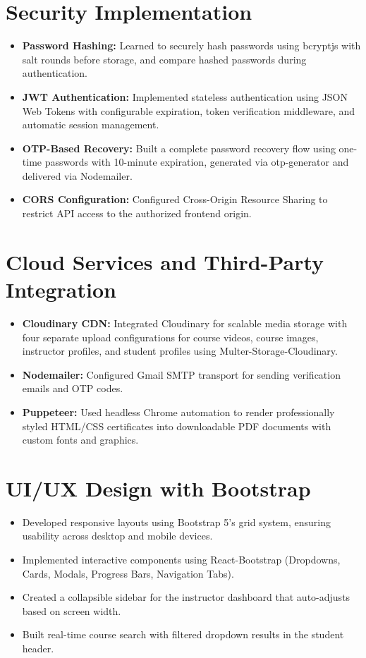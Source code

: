 \documentclass[12pt,a4paper]{report}
\begin{document}
\section{Security Implementation}
\begin{itemize}
    \item \textbf{Password Hashing:} Learned to securely hash passwords using bcryptjs with salt rounds before storage, and compare hashed passwords during authentication.
    \item \textbf{JWT Authentication:} Implemented stateless authentication using JSON Web Tokens with configurable expiration, token verification middleware, and automatic session management.
    \item \textbf{OTP-Based Recovery:} Built a complete password recovery flow using one-time passwords with 10-minute expiration, generated via otp-generator and delivered via Nodemailer.
    \item \textbf{CORS Configuration:} Configured Cross-Origin Resource Sharing to restrict API access to the authorized frontend origin.
\end{itemize}

\section{Cloud Services and Third-Party Integration}
\begin{itemize}
    \item \textbf{Cloudinary CDN:} Integrated Cloudinary for scalable media storage with four separate upload configurations for course videos, course images, instructor profiles, and student profiles using Multer-Storage-Cloudinary.
    \item \textbf{Nodemailer:} Configured Gmail SMTP transport for sending verification emails and OTP codes.
    \item \textbf{Puppeteer:} Used headless Chrome automation to render professionally styled HTML/CSS certificates into downloadable PDF documents with custom fonts and graphics.
\end{itemize}

\section{UI/UX Design with Bootstrap}
\begin{itemize}
    \item Developed responsive layouts using Bootstrap 5's grid system, ensuring usability across desktop and mobile devices.
    \item Implemented interactive components using React-Bootstrap (Dropdowns, Cards, Modals, Progress Bars, Navigation Tabs).
    \item Created a collapsible sidebar for the instructor dashboard that auto-adjusts based on screen width.
    \item Built real-time course search with filtered dropdown results in the student header.
\end{itemize}
\end{document}

